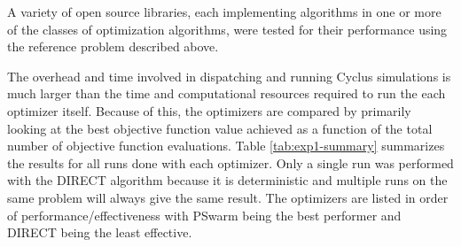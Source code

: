 A variety of open source libraries, each implementing algorithms in one or
more of the classes of optimization algorithms, were tested for their
performance using the reference problem described above.

The overhead and time involved in dispatching and running Cyclus simulations
is much larger than the time and computational resources required to run the
each optimizer itself. Because of this, the optimizers are compared by
primarily looking at the best objective function value achieved as a function
of the total number of objective function evaluations.  Table
\ref{tab:exp1-summary} summarizes the results for all runs done with each
optimizer.  Only a single run was performed with the DIRECT algorithm because
it is deterministic and multiple runs on the same problem will always give the
same result.  The optimizers are listed in order of performance/effectiveness
with PSwarm being the best performer and DIRECT being the least effective.

